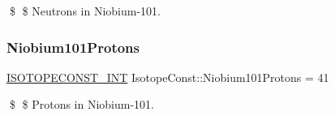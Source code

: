 \$ \$ Neutrons in Niobium-\/101. \mbox{\label{group___isotope_const-_niobium-_nb101_ga4daccecf5273747f915fb04b9c642fd0}} 
\subsubsection{\texorpdfstring{Niobium101\+Protons}{Niobium101Protons}}
{\footnotesize\ttfamily \mbox{\hyperlink{group___isotope_const-_macros_ga5f18360b3e99483a35c32d789e62621c}{I\+S\+O\+T\+O\+P\+E\+C\+O\+N\+S\+T\+\_\+\+I\+NT}} Isotope\+Const\+::\+Niobium101\+Protons = 41}

\$ \$ Protons in Niobium-\/101. 